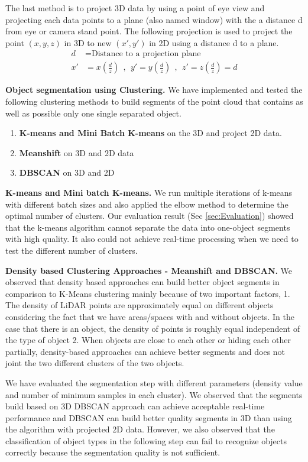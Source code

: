 The last method is to project 3D data by using a point of eye view and projecting each data points
to a plane (also named window) with the a distance d from eye or camera stand point. 
The following projection is used to project the point $(x,y,z)$ in 3D to new $(x',  y')$ in 2D
using a distance d to a plane.
\begin{align*}
d  & = \text{Distance to a projection plane} \\
x' & =  x (\frac{d}{z}) \ \  , \ \  y' =  y (\frac{d}{z}) \ \  , \ \  z'=  z (\frac{d}{z}) = d
\end{align*}

\textbf{Object segmentation using Clustering.}
We have implemented and tested the following clustering methods to build segments of the point cloud 
that contains as well as possible only one single separated object.

\begin{enumerate}
  \item \textbf{K-means and Mini Batch K-means} on the 3D and project 2D data.
  \item \textbf{Meanshift} on 3D and 2D data
  \item \textbf{DBSCAN} on 3D and 2D
\end{enumerate}

\textbf{K-means and Mini batch K-means.} 
We run multiple iterations of k-means with
different batch sizes and also applied the elbow method to determine the optimal number of clusters.
Our evaluation result (Sec \ref{sec:Evaluation}) showed that the k-means algorithm cannot separate the data into one-object segments with high quality. 
It also could not achieve real-time processing when we need to test the different number of clusters.

\textbf{Density based Clustering Approaches - Meanshift and DBSCAN.} 
We observed that density based approaches can build better object segments 
in comparison to K-Means clustering mainly because of two important factors, 1. The density of LiDAR points are approximately equal on different 
objects considering the fact that we have areas/spaces with and without objects. In the case that there is an object, the density of points is 
roughly equal independent of the type of object 2. When objects are close to each other or hiding each other partially, density-based approaches 
can achieve better segments and does not joint the two different clusters of the two objects.

We have evaluated the segmentation step with different parameters (density value and number of minimum samples in each cluster). 
We observed that the segments build based on 3D DBSCAN approach can achieve acceptable real-time performance and  DBSCAN can build better 
quality segments in 3D than using the algorithm with projected 2D data. However, we also observed that the classification of object types 
in the following step can fail to recognize objects correctly because the segmentation quality is not sufficient.


